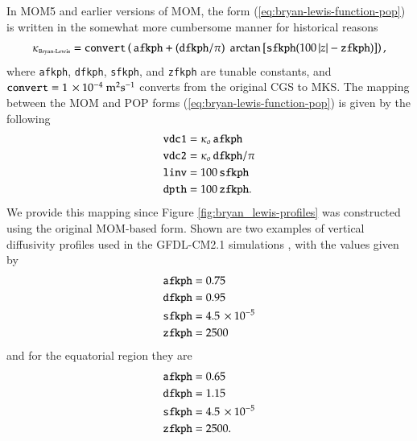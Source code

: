 In MOM5 and earlier versions of MOM, the form
(\ref{eq:bryan-lewis-function-pop}) is written in the somewhat more
cumbersome manner for historical reasons
\begin{equation}
 \kappa_{\mbox{\tiny Bryan-Lewis}} = {\tt convert} \left( 
       \,{\tt afkph}
   +  ({\tt dfkph}/\pi)  \; \arctan\left[ {\tt sfkph} (100 \,  |z| - {\tt zfkph} ) \right]
    \right),
\label{eq:bryan-lewis-function-mom}
\end{equation}
where {\tt afkph}, {\tt dfkph}, {\tt sfkph}, and {\tt zfkph} are
tunable constants, and ${\tt convert} = 1 \, \times
10^{-4}~\mbox{m}^{2}\mbox{s}^{-1}$ converts from the original CGS to
MKS.  The mapping between the MOM and POP forms
(\ref{eq:bryan-lewis-function-pop}) is given by the following
\begin{align}
{\tt vdc1} &= \kappa_{o} \, {\tt afkph}
\\
 {\tt vdc2} &= \kappa_{o} \, {\tt dfkph}/\pi
\\
 {\tt linv}     &= 100 \, {\tt sfkph}
\\
 {\tt dpth} &= 100 \, {\tt zfkph}.
\end{align}
We provide this mapping since Figure \ref{fig:bryan_lewis-profiles}
was constructed using the original MOM-based form.  Shown are two
examples of vertical diffusivity profiles used in the GFDL-CM2.1
simulations \citep[see][for discussion]{OMDT2005a}, with the values
given by 
\begin{align}
{\tt afkph} &=0.75
 \\
{\tt dfkph} &=0.95
\\
{\tt sfkph} &=4.5 \, \times 10^{-5}
\\
{\tt zfkph} &=2500
\label{fig:bryan_lewis-profiles-polar}
\end{align}
and for the equatorial region they are 
\begin{align}
{\tt afkph} &=0.65
\\
 {\tt dfkph} &=1.15
\\
 {\tt sfkph} &= 4.5 \, \times 10^{-5}
\\
 {\tt zfkph} &=2500.
\label{fig:bryan_lewis-profiles-tropics}
\end{align}




